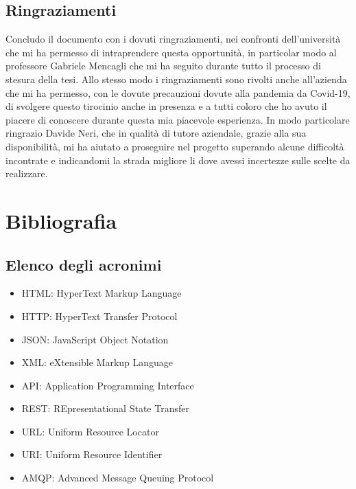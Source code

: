 \documentclass[a4paper,titlepage,12pt]{report}
\begin{document}
{\section{
Ringraziamenti}
Concludo il documento con i dovuti ringraziamenti, nei confronti dell'università che mi ha permesso di intraprendere questa opportunità, in particolar modo al professore Gabriele Mencagli che mi ha seguito durante tutto il processo di stesura della tesi. Allo stesso modo i ringraziamenti sono rivolti anche all'azienda che mi ha permesso, con le dovute precauzioni dovute alla pandemia da Covid-19, di svolgere questo tirocinio anche in presenza e a tutti coloro che ho avuto il piacere di conoscere durante questa mia piacevole esperienza. In modo particolare ringrazio Davide Neri, che in qualità di tutore aziendale, grazie alla sua disponibilità, mi ha aiutato a proseguire nel progetto superando alcune difficoltà incontrate e indicandomi la strada migliore li dove avessi incertezze sulle scelte da realizzare.


}


\chapter{
Bibliografia}

\section{
Elenco degli acronimi}
\begin{itemize}
\item HTML: HyperText Markup Language
\item HTTP: HyperText Transfer Protocol
\item JSON: JavaScript Object Notation
\item XML: eXtensible Markup Language
\item API: Application Programming Interface
\item REST: REpresentational State Transfer
\item URL: Uniform Resource Locator
\item URI: Uniform Resource Identifier
\item AMQP: Advanced Message Queuing Protocol

\end{itemize}
\end{document}
